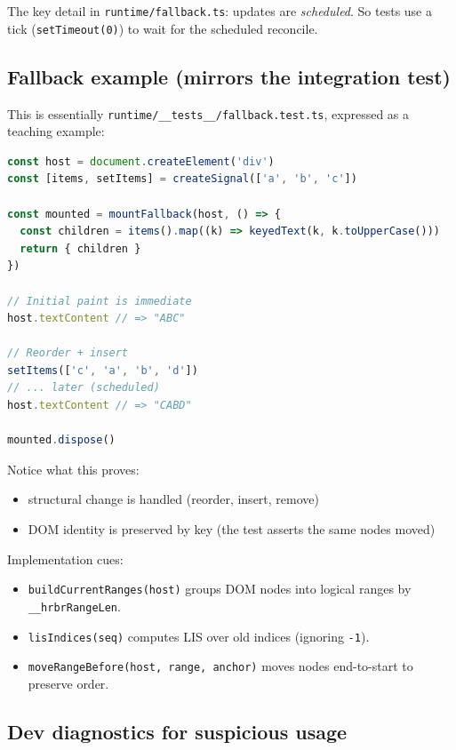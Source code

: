 The key detail in \texttt{runtime/fallback.ts}: updates are \emph{scheduled}.
So tests use a tick (\texttt{setTimeout(0)}) to wait for the scheduled reconcile.

\subsection{Fallback example (mirrors the integration test)}

This is essentially \texttt{runtime/\_\_tests\_\_/fallback.test.ts}, expressed as a teaching example:

\begin{lstlisting}[language=JavaScript]
const host = document.createElement('div')
const [items, setItems] = createSignal(['a', 'b', 'c'])

const mounted = mountFallback(host, () => {
  const children = items().map((k) => keyedText(k, k.toUpperCase()))
  return { children }
})

// Initial paint is immediate
host.textContent // => "ABC"

// Reorder + insert
setItems(['c', 'a', 'b', 'd'])
// ... later (scheduled)
host.textContent // => "CABD"

mounted.dispose()
\end{lstlisting}

Notice what this proves:

\begin{itemize}
  \item structural change is handled (reorder, insert, remove)
  \item DOM identity is preserved by key (the test asserts the same nodes moved)
\end{itemize}

Implementation cues:

\begin{itemize}
  \item \texttt{buildCurrentRanges(host)} groups DOM nodes into logical ranges by \texttt{\_\_hrbrRangeLen}.
  \item \texttt{lisIndices(seq)} computes LIS over old indices (ignoring \texttt{-1}).
  \item \texttt{moveRangeBefore(host, range, anchor)} moves nodes end-to-start to preserve order.
\end{itemize}

\subsection{Dev diagnostics for suspicious usage}

